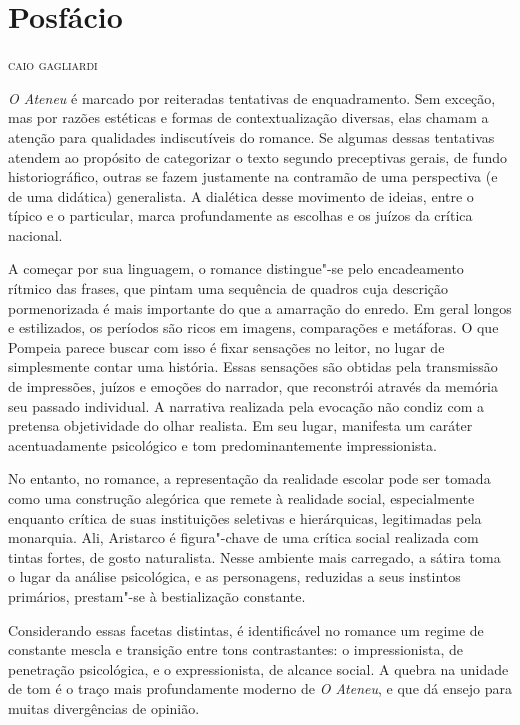 \chapter[Posfácio]{Posfácio }


\begin{flushright}
\textsc{caio gagliardi}
\end{flushright}

\noindent{}\textit{O Ateneu} é marcado por reiteradas
tentativas de enquadramento. Sem exceção, mas por razões estéticas e
formas de contextualização diversas, elas chamam a atenção para
qualidades indiscutíveis do romance. Se algumas dessas tentativas
atendem ao propósito de categorizar o texto segundo preceptivas gerais,
de fundo historiográfico, outras se fazem justamente na contramão de
uma perspectiva (e de uma didática) generalista. A dialética desse
movimento de ideias, entre o típico e o particular, marca profundamente
as escolhas e os juízos da crítica nacional. 

A começar por sua linguagem, o romance distingue"-se pelo encadeamento
rítmico das frases, que pintam uma sequência de quadros cuja descrição
pormenorizada é mais importante do que a amarração do enredo. Em geral
longos e estilizados, os períodos são ricos em imagens, comparações e
metáforas. O que Pompeia parece buscar com isso é fixar sensações no
leitor, no lugar de simplesmente contar uma história. Essas sensações
são obtidas pela transmissão de impressões, juízos e emoções do
narrador, que reconstrói através da memória seu passado individual. A
narrativa realizada pela evocação não condiz com a pretensa
objetividade do olhar realista. Em seu lugar, manifesta um caráter
acentuadamente psicológico e tom predominantemente impressionista.

No entanto, no romance, a representação da realidade escolar pode ser
tomada como uma construção alegórica que remete à realidade social,
especialmente enquanto crítica de suas instituições seletivas e
hierárquicas, legitimadas pela monarquia. Ali, Aristarco é
figura"-chave de uma crítica social realizada com tintas fortes, de
gosto naturalista. Nesse ambiente mais carregado, a sátira toma o lugar
da análise psicológica, e as personagens, reduzidas a seus instintos
primários, prestam"-se à bestialização constante.

Considerando essas facetas distintas, é identificável no
romance um regime de constante mescla e transição entre tons
contrastantes: o impressionista, de penetração psicológica, e o
expressionista, de alcance social. A quebra na unidade de tom é o traço
mais profundamente moderno de \textit{O Ateneu}, 
e que dá ensejo para muitas divergências de opinião.  

